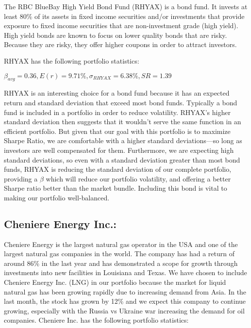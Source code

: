\documentclass{article}
\begin{document}
The RBC BlueBay High Yield Bond Fund (RHYAX) is a bond fund. It invests at least 80\% of its assets in fixed income securities and/or investments that provide exposure to fixed income securities that are non-investment grade (high yield). High yield bonds are known to focus on lower quality bonds that are risky. Because they are risky, they offer higher coupons in order to attract investors. 

RHYAX has the following portfolio statistics:

\begin{center}
    \begin{math}
        \beta_{avg} = 0.36, E(r) = 9.71\%, \sigma_{RHYAX} = 6.38\%, SR = 1.39
    \end{math}
\end{center}

RHYAX is an interesting choice for a bond fund because it has an expected return and standard deviation that exceed most bond funds. Typically a bond fund is included in a portfolio in order to reduce volatility. RHYAX's higher standard deviation then suggests that it wouldn't serve the same function in an efficient portfolio. But given that our goal with this portfolio is to maximize Sharpe Ratio, we are comfortable with a higher standard deviations—so long as investors are well compensated for them. Furthermore, we are expecting high standard deviations, so even with a standard deviation greater than most bond funds, RHYAX is reducing the standard deviation of our complete portfolio, providing a $\beta$ which will reduce our portfolio volatility, and offering a better Sharpe ratio better than the market bundle. Including this bond is vital to making our portfolio well-balanced. 

\subsection{Cheniere Energy Inc.:}

Cheniere Energy is the largest natural gas operator in the USA and one of the largest natural gas companies in the world. The company has had a return of around 86\% in the last year and has demonstrated a scope for growth through investments into new facilities in Louisiana and Texas. We have chosen to include Cheniere Energy Inc. (LNG) in our portfolio because the market for liquid natural gas has been growing rapidly due to increasing demand from Asia. In the last month, the stock has grown by 12\% and we expect this company to continue growing, especially with the Russia vs Ukraine war increasing the demand for oil companies. Cheniere Inc. has the following portfolio statistics:
\end{document}
